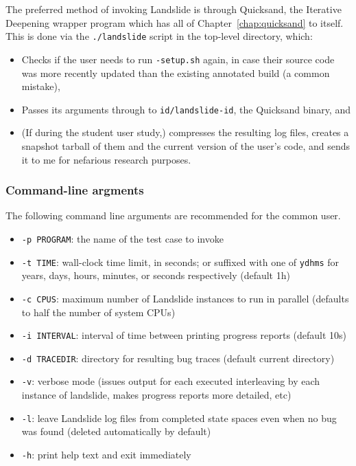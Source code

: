 The preferred method of invoking Landslide is through Quicksand, the Iterative Deepening wrapper program which has all of Chapter~\ref{chap:quicksand} to itself.
This is done via the {\tt ./landslide} script in the top-level directory, which:
\begin{itemize}
	\item Checks if the user needs to run {\tt *-setup.sh} again, in case their source code was more recently updated than the existing annotated build (a common mistake),
	\item Passes its arguments through to {\tt id/landslide-id}, the Quicksand binary,
		and
	\item (If during the student user study,) compresses the resulting log files,
		creates a snapshot tarball of them and the current version of the user's code,
		and sends it to me for nefarious research purposes.
\end{itemize}


\subsubsection{Command-line argments}

The following command line arguments are recommended for the common user.

\begin{itemize}
	\item {\tt -p PROGRAM}: the name of the test case to invoke
	\item {\tt -t TIME}: wall-clock time limit, in seconds; or suffixed with one of {\tt ydhms} for years, days, hours, minutes, or seconds respectively (default 1h)
	\item {\tt -c CPUS}: maximum number of Landslide instances to run in parallel (defaults to half the number of system CPUs)
	\item {\tt -i INTERVAL}: interval of time between printing progress reports (default 10s)
	\item {\tt -d TRACEDIR}: directory for resulting bug traces (default current directory)
	\item {\tt -v}: verbose mode (issues output for each executed interleaving by each instance of landslide, makes progress reports more detailed, etc)
	\item {\tt -l}: leave Landslide log files from completed state spaces even when no bug was found (deleted automatically by default)
	\item {\tt -h}: print help text and exit immediately
\end{itemize}


